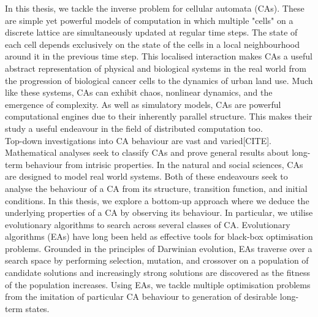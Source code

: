 In this thesis, we tackle the inverse problem for cellular automata (CAs). These are simple yet powerful models of computation in which multiple "cells" on a discrete lattice are simultaneously updated at regular time steps. The state of each cell depends exclusively on the state of the cells in a local neighbourhood around it in the previous time step. This localised interaction makes CAs a useful abstract representation of physical and biological systems in the real world from the progression of biological cancer cells\cite{deutsch2021bio, reher2017cell} to the dynamics of urban land use\cite{white2000high}. Much like these systems, CAs can exhibit chaos, nonlinear dynamics, and the emergence of complexity. As well as simulatory models, CAs are powerful computational engines due to their inherently parallel structure. This makes their study a useful endeavour in the field of distributed computation too\cite{tosic2005cellular}.\\

Top-down investigations into CA behaviour are vast and varied[CITE]. Mathematical analyses seek to classify CAs and prove general results about long-term behaviour from intrisic properties. In the natural and social sciences, CAs are designed to model real world systems. Both of these endeavours seek to analyse the behaviour of a CA from its structure, transition function, and initial conditions. In this thesis, we explore a bottom-up approach where we deduce the underlying properties of a CA by observing its behaviour. In particular, we utilise evolutionary algorithms to search across several classes of CA. Evolutionary algorithms (EAs) have long been held as effective tools for black-box optimisation problems. Grounded in the principles of Darwinian evolution, EAs traverse over a search space by performing selection, mutation, and crossover on a population of candidate solutions and increasingly strong solutions are discovered as the fitness of the population increases. Using EAs, we tackle multiple optimisation problems from the imitation of particular CA behaviour to generation of desirable long-term states.\\


